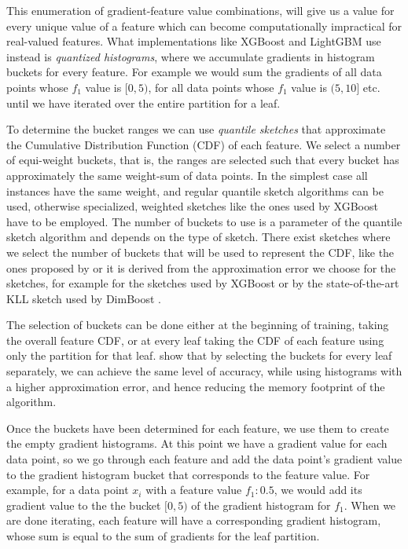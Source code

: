 This enumeration of gradient-feature value combinations, will give us a value for every unique value
of a feature which can become computationally impractical for real-valued features.
What implementations like XGBoost and LightGBM use instead is \emph{quantized histograms},
where we accumulate gradients in histogram buckets for every feature. For example
we would sum the gradients of all data points whose $f_1$ value is $[0, 5)$, for all
data points whose $f_1$ value is $(5, 10]$ etc. until we have iterated over
the entire partition for a leaf.

To determine the bucket ranges we
can use \emph{quantile sketches} \cite{greenwald2016quantiles} that approximate
the Cumulative Distribution Function (CDF) of each feature. We select a number of
equi-weight buckets, that is, the ranges are selected such that every bucket
has approximately the same weight-sum of data points. In the simplest case
all instances have the same weight, and regular quantile sketch algorithms
can be used, otherwise specialized, weighted sketches like the ones used by XGBoost
have to be employed.
The number of buckets to use is a
parameter of the quantile sketch algorithm and depends on the type of sketch.
There exist sketches where we select the number of buckets that
will be used to represent the CDF, like the ones proposed by \citet{BenHaim2010parallel}
or it is derived from the approximation error we choose for the sketches, for example
for the sketches used by XGBoost or by the state-of-the-art KLL sketch \cite{karnin2016kll}
used by DimBoost \cite{dimboost}.


The selection of buckets can be done either at the beginning of training, taking the
overall feature CDF, or at every leaf taking the CDF of each feature using only the
partition for that leaf. \citet{xgboost} show that by selecting the buckets for every
leaf separately, we can achieve the same level of accuracy, while using histograms with a higher approximation error, and hence reducing the memory footprint of the algorithm.

Once the buckets have been determined for each feature, we use them to create
the empty gradient histograms. At this point we have a gradient value for each data point, so
we go through each feature and add the data point's gradient value to the gradient
histogram bucket
that corresponds to the feature value.
For example, for a data point $x_i$ with a feature value $f_1 : 0.5$, we would add its
gradient value to the
the bucket $[0, 5)$ of the gradient histogram for $f_1$.
When we are done iterating, each feature will have a corresponding gradient histogram,
whose sum is equal to the sum of gradients for the leaf partition.


